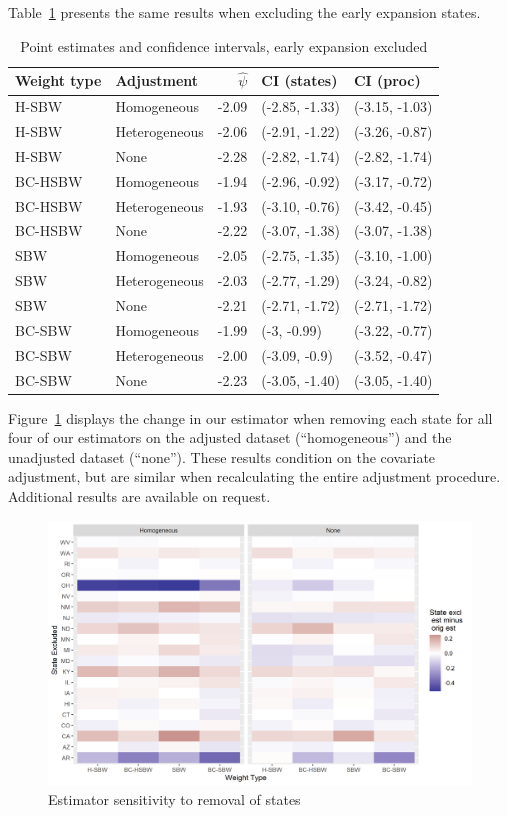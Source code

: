 Table~\ref{tab:confintmainc2} presents the same results when excluding the early expansion states.

\begin{table}[h!]
\centering
\caption{Point estimates and confidence intervals, early expansion excluded}
\label{tab:confintmainc2}
\begin{tabular}{llrll}
  \hline
Weight type & Adjustment & $\hat{\psi}$ & CI (states) & CI (proc) \\ 
  \hline
H-SBW & Homogeneous & -2.09 & (-2.85, -1.33) & (-3.15, -1.03) \\ 
  H-SBW & Heterogeneous & -2.06 & (-2.91, -1.22) & (-3.26, -0.87) \\ 
  H-SBW & None & -2.28 & (-2.82, -1.74) & (-2.82, -1.74) \\ 
  BC-HSBW & Homogeneous & -1.94 & (-2.96, -0.92) & (-3.17, -0.72) \\ 
  BC-HSBW & Heterogeneous & -1.93 & (-3.10, -0.76) & (-3.42, -0.45) \\ 
  BC-HSBW & None & -2.22 & (-3.07, -1.38) & (-3.07, -1.38) \\ 
  SBW & Homogeneous & -2.05 & (-2.75, -1.35) & (-3.10, -1.00) \\ 
  SBW & Heterogeneous & -2.03 & (-2.77, -1.29) & (-3.24, -0.82) \\ 
  SBW & None & -2.21 & (-2.71, -1.72) & (-2.71, -1.72) \\ 
  BC-SBW & Homogeneous & -1.99 & (-3, -0.99) & (-3.22, -0.77) \\ 
  BC-SBW & Heterogeneous & -2.00 & (-3.09, -0.9) & (-3.52, -0.47) \\ 
  BC-SBW & None & -2.23 & (-3.05, -1.40) & (-3.05, -1.40) \\ 
   \hline
\end{tabular}
\end{table}

Figure~\ref{fig:loostateplot} displays the change in our estimator when removing each state for all four of our estimators on the adjusted dataset (``homogeneous'') and the unadjusted dataset (``none''). These results condition on the covariate adjustment, but are similar when recalculating the entire adjustment procedure. Additional results are available on request.

\begin{figure}[H]
\begin{center}
    \caption{Estimator sensitivity to removal of states}
    \label{fig:loostateplot}
    \includegraphics[scale=0.6]{01_Plots/loostate-sensitivityc1-state-uu-i.png}
\end{center}
\end{figure}

\clearpage
